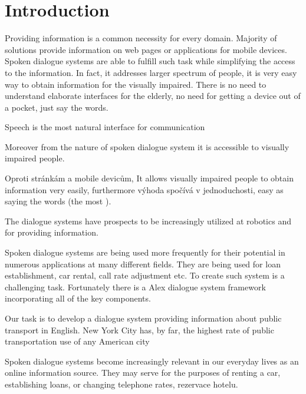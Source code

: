\chapter*{Introduction}

Providing information is a common necessity for every domain.
Majority of solutions provide information on web pages or applications for mobile devices.
Spoken dialogue systems are able to fulfill such task while simplifying the access to the information.
In fact, it addresses larger spectrum of people, it is very easy way to obtain information for the visually impaired.
There is no need to understand elaborate interfaces for the elderly, no need for getting a device out of a pocket, just say the words.

Speech is the most natural interface for communication

Moreover from the nature of spoken dialogue system it is accessible to visually impaired people.


Oproti stránkám a mobile devicům, It allows visually impaired people to obtain information very easily, furthermore výhoda spočívá v jednoduchosti, easy as saying the words (the most ). 



The dialogue systems have prospects to be increasingly utilized at robotics and for providing information.

Spoken dialogue systems are being used more frequently for their potential in numerous applications at many different fields.
They are being used for loan establishment, car rental, call rate adjustment etc.
To create such system is a challenging task.
Fortunately there is a Alex dialogue system framework incorporating all of the key components.

Our task is to develop a dialogue system providing information about public transport in English.
 New York City has, by far, the highest rate of public transportation use of any American city


Spoken dialogue systems become increasingly relevant in our everyday lives as an online information source.
They may serve for the purposes of renting a car, establishing loans, or changing telephone rates, rezervace hotelu.

